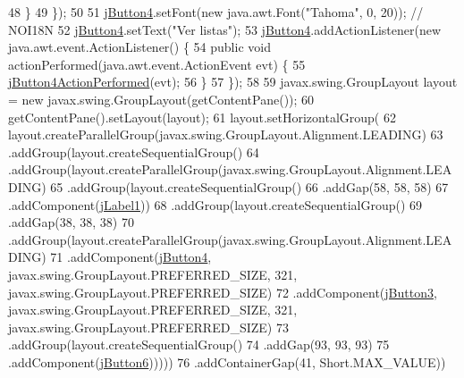 \begin{DoxyCode}
48             \}
49         \});
50 
51         \mbox{\hyperlink{classsoftware_1_1_opcionesdirector_a2e31e9baad7d82ddcdf5f15d48c07483}{jButton4}}.setFont(\textcolor{keyword}{new} java.awt.Font(\textcolor{stringliteral}{"Tahoma"}, 0, 20)); \textcolor{comment}{// NOI18N}
52         \mbox{\hyperlink{classsoftware_1_1_opcionesdirector_a2e31e9baad7d82ddcdf5f15d48c07483}{jButton4}}.setText(\textcolor{stringliteral}{"Ver listas"});
53         \mbox{\hyperlink{classsoftware_1_1_opcionesdirector_a2e31e9baad7d82ddcdf5f15d48c07483}{jButton4}}.addActionListener(\textcolor{keyword}{new} java.awt.event.ActionListener() \{
54             \textcolor{keyword}{public} \textcolor{keywordtype}{void} actionPerformed(java.awt.event.ActionEvent evt) \{
55                 \mbox{\hyperlink{classsoftware_1_1_opcionesdirector_ac54a366add94d48d2b25ed78bfd9dcc4}{jButton4ActionPerformed}}(evt);
56             \}
57         \});
58 
59         javax.swing.GroupLayout layout = \textcolor{keyword}{new} javax.swing.GroupLayout(getContentPane());
60         getContentPane().setLayout(layout);
61         layout.setHorizontalGroup(
62             layout.createParallelGroup(javax.swing.GroupLayout.Alignment.LEADING)
63             .addGroup(layout.createSequentialGroup()
64                 .addGroup(layout.createParallelGroup(javax.swing.GroupLayout.Alignment.LEADING)
65                     .addGroup(layout.createSequentialGroup()
66                         .addGap(58, 58, 58)
67                         .addComponent(\mbox{\hyperlink{classsoftware_1_1_opcionesdirector_aa19e2adc2e7b50296972e1d6fd9d0b65}{jLabel1}}))
68                     .addGroup(layout.createSequentialGroup()
69                         .addGap(38, 38, 38)
70                         .addGroup(layout.createParallelGroup(javax.swing.GroupLayout.Alignment.LEADING)
71                             .addComponent(\mbox{\hyperlink{classsoftware_1_1_opcionesdirector_a2e31e9baad7d82ddcdf5f15d48c07483}{jButton4}}, javax.swing.GroupLayout.PREFERRED\_SIZE, 321, 
      javax.swing.GroupLayout.PREFERRED\_SIZE)
72                             .addComponent(\mbox{\hyperlink{classsoftware_1_1_opcionesdirector_a6bf8e6340c64a01cd895c1194d0e2fca}{jButton3}}, javax.swing.GroupLayout.PREFERRED\_SIZE, 321, 
      javax.swing.GroupLayout.PREFERRED\_SIZE)
73                             .addGroup(layout.createSequentialGroup()
74                                 .addGap(93, 93, 93)
75                                 .addComponent(\mbox{\hyperlink{classsoftware_1_1_opcionesdirector_ab4528484730d083362682ff5055fb012}{jButton6}})))))
76                 .addContainerGap(41, Short.MAX\_VALUE))

\end{DoxyCode}
